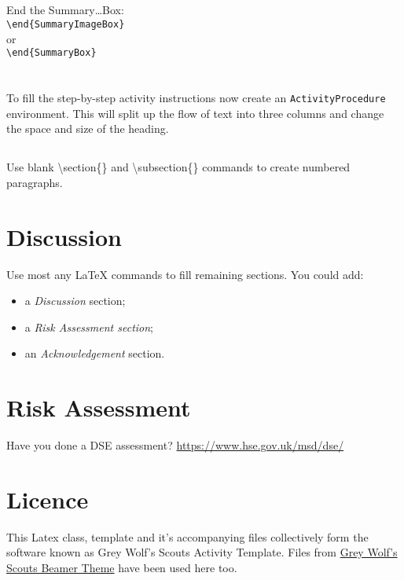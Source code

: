 \documentclass[a4paper]{GreyWolfsScoutActivityTemplate}
\begin{document}
\begin{ActivityProcedure}
\subsection{}
End the Summary\ldots{}Box:\\
{\tt \textbackslash{}end\{SummaryImageBox\}}\\
or\\
{\tt \textbackslash{}end\{SummaryBox\}}

\section{}
To fill the step-by-step activity instructions now create an {\tt ActivityProcedure} environment. This will split up the flow of text into three columns and change the space and size of the heading.

\subsection{}
Use blank \textbackslash{}section\{\} and \textbackslash{}subsection\{\} commands to create numbered paragraphs.

\end{ActivityProcedure}



\section*{Discussion}
Use most any \LaTeX{} commands to fill remaining sections.
You could add:
\begin{itemize}
 \item a \textit{Discussion} section; 
 \item a \textit{Risk Assessment section};
 \item an \textit{Acknowledgement} section.
\end{itemize}



\section*{Risk Assessment}
\label{RA}
Have you done a DSE assessment? \href{https://www.hse.gov.uk/msd/dse/}{https://www.hse.gov.uk/msd/dse/}



\section*{Licence}
This Latex class, template and it's accompanying files collectively form the software known as Grey Wolf's Scouts Activity Template. Files from \href{https://github.com/nimpo/GreyWolfsScoutsBeamerTheme}{Grey Wolf's Scouts Beamer Theme} have been used here too.
\end{document}
